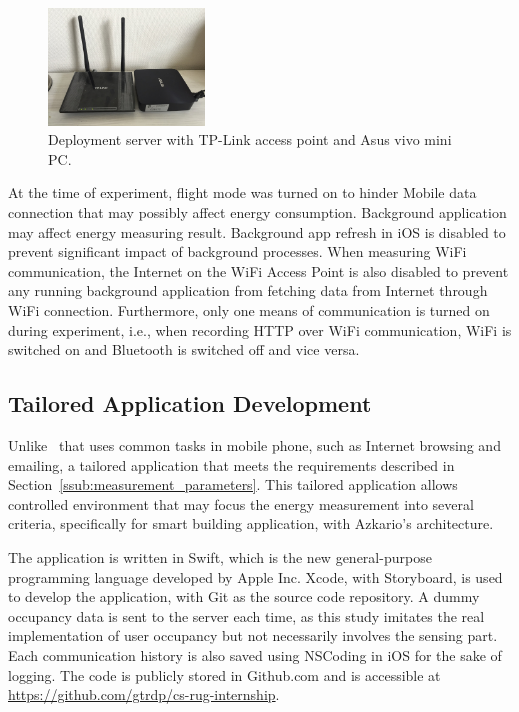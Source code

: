 \documentclass[journal]{vgtc}                %
\begin{document}
\begin{figure}
  \centering
    \includegraphics[width=0.37\textwidth]{deployment}
  \caption{Deployment server with TP-Link access point and Asus vivo mini PC.}
  \label{fig:deployment-server}
\end{figure}

At the time of experiment, flight mode was turned on to hinder Mobile data connection that may possibly affect energy consumption.  Background application may affect energy measuring result. Background app refresh in iOS is disabled to prevent significant impact of background processes. When measuring WiFi communication, the Internet on the WiFi Access Point is also disabled to prevent any running background application from fetching data from Internet through WiFi connection. Furthermore, only one means of communication is turned on during experiment, i.e., when recording HTTP over WiFi communication, WiFi is switched on and Bluetooth is switched off and vice versa.


\subsection{Tailored Application Development} %
\label{sub:tailored_application_development}
Unlike~\cite{Balasubramanian2009} that uses common tasks in mobile phone, such as Internet browsing and emailing, a tailored application that meets the requirements described in Section~\ref{ssub:measurement_parameters}. This tailored application allows controlled environment that may focus the energy measurement into several criteria, specifically for smart building application, with Azkario's architecture.

The application is written in Swift, which is the new general-purpose programming language developed by Apple Inc. Xcode, with Storyboard, is used to develop the application, with Git as the source code repository. A dummy occupancy data is sent to the server each time, as this study imitates the real implementation of user occupancy but not necessarily involves the sensing part. Each communication history is also saved using NSCoding in iOS for the sake of logging. The code is publicly stored in Github.com and is accessible at \url{https://github.com/gtrdp/cs-rug-internship}.
\end{document}
